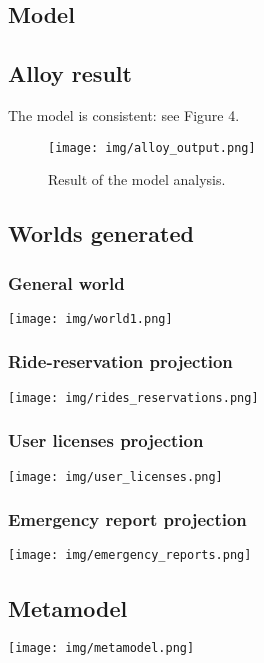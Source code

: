 \subsection{Model}


\subsection{Alloy result}
	The model is consistent: see Figure 4.
	\begin{figure}
		\texttt{[image: img/alloy\_output.png]}
		\caption{Result of the model analysis.}
		\label{figure 1}
	\end{figure}



	\begin{landscape}
	
	\subsection{Worlds generated}
	
		\subsubsection{General world}
			\texttt{[image: img/world1.png]}
	
		\subsubsection{Ride-reservation projection}
			\texttt{[image: img/rides\_reservations.png]}
	
		\subsubsection{User licenses projection}
			\texttt{[image: img/user\_licenses.png]}
		
		\subsubsection{Emergency report projection}
			\texttt{[image: img/emergency\_reports.png]}
	\end{landscape}
	
	\begin{landscape}
	\subsection{Metamodel}
		\texttt{[image: img/metamodel.png]}
	\end{landscape}